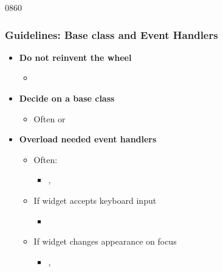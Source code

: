 \begin{slide}{0860}
  \frametitle{Guidelines: Base class and Event Handlers}
  \label{writing_your_own_widget}
  \begin{itemize}
  \item \textbf{Do not reinvent the wheel}
    \begin{itemize}
    \item {}
    \end{itemize}
  \item \textbf{Decide on a base class}
    \begin{itemize}
    \item Often  or 
    \end{itemize}
  \item \textbf{Overload needed event handlers}
    \begin{itemize}
    \item Often:
      \begin{itemize}
      \item {}, \\ 
      \end{itemize}
    \item If widget accepts keyboard input
      \begin{itemize}
      \item {}
      \end{itemize}
    \item If widget changes appearance on focus
      \begin{itemize}
      \item {}, \\ 
      \end{itemize}
  \end{itemize}
  \end{itemize}
\end{slide}

